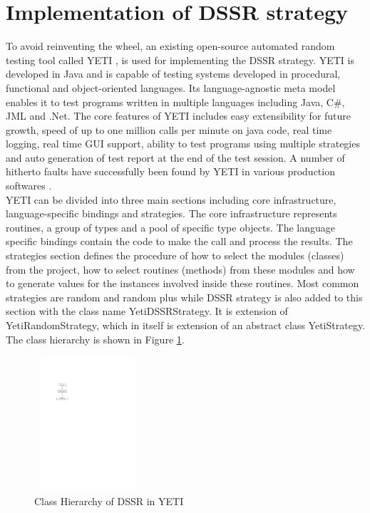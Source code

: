 \documentclass[conference]{IEEEtran}
\begin{document}
\section{Implementation of DSSR strategy}
To avoid reinventing the wheel, an existing open-source automated random testing tool called YETI \cite{Oriol2011}, \cite{Oriol2012} is used for implementing the DSSR strategy. YETI is developed in Java and is capable of testing systems developed in procedural, functional and object-oriented languages. Its language-agnostic meta model enables it to test programs written in multiple languages including Java, C\#, JML and .Net. The core features of YETI includes easy extensibility for future growth, speed of up to one million calls per minute on java code, real time logging, real time GUI support, ability to test programs using multiple strategies and auto generation of test report at the end of the test session. A number of hitherto faults have successfully been found by YETI in various production softwares \cite{Oriol2012}. \\
\indent YETI can be divided into three main sections including core infrastructure, language-specific bindings and strategies. The core infrastructure represents routines, a group of types and a pool of specific type objects. The language specific bindings contain the code to make the call and process the results. The strategies section defines the procedure of how to select the modules (classes) from the project, how to select routines (methods) from these modules and how to generate values for the instances involved inside these routines. Most common strategies are random and random plus while DSSR strategy is also added to this section with the class name YetiDSSRStrategy. It is extension of YetiRandomStrategy, which in itself is extension of an abstract class YetiStrategy. The class hierarchy is shown in Figure \ref{fig:hierarchyofDSSR}.

\begin{figure}[ht]
\centering
\includegraphics[width=4cm,height=5cm]{hierarchy.pdf}
\caption{Class Hierarchy of DSSR in YETI}
\label{fig:hierarchyofDSSR}
\end{figure}
\end{document}

